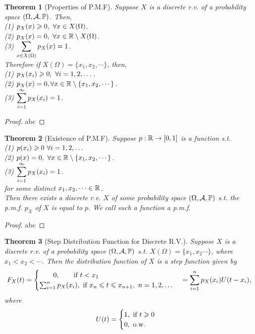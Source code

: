 \documentclass[openany,12pt]{book}
\newtheorem{theorem}{Theorem}[chapter]
\begin{document}
\begin{theorem}[Properties of P.M.F]
Suppose $X$ is a discrete r.v. of a probability space $(\Omega,\mathcal{A},\mathbb{P})$. Then,\\
(1) $p_X (x)\geqslant0,\ \forall x\in X(\Omega)$.\\
(2) $p_X (x)=0,\ \forall x\in\mathbb{R}\setminus X(\Omega)$.\\
(3) $\displaystyle\sum_{x\in X(\Omega)}p_X (x) =1$.\\
Therefore if $X(\Omega)=\{x_1,x_2,\cdots\}$, then,\\
(1) $p_X (x_i )\geqslant0,\ \forall i=1,2,\dots$.\\
(2) $p_X (x)=0,\forall x\in\mathbb{R}\setminus\{x_1,x_2,\cdots\}$.\\
(3) $\displaystyle\sum_{i=1}^\infty p_X (x_i ) =1$.\\
\end{theorem}

\begin{proof}
  abc
\end{proof}

\begin{theorem}[Existence of P.M.F]
Suppose $p: \mathbb{R}\to[0,1]$ is a function s.t.\\
(1) $p(x_i )\geqslant0\ \forall i=1,2,\dots$\\
(2) $p(x)=0,\ \forall x\in\mathbb{R}\setminus\{x_1,x_2,\cdots\}$.\\
(3) $\displaystyle\sum_{i=1}^\infty p_X (x_i ) =1$.\\
for some distinct $x_1,x_2,\cdots\in\mathbb{R}$.\\
Then there exists a discrete r.v. $X$ of some probability space $(\Omega,\mathcal{A},\mathbb{P})$ s.t. the p.m.f. $p_X$ of $X$ is equal to $p$. We call such a function a p.m.f.
\end{theorem}

\begin{proof}
  abc
\end{proof}

\begin{theorem}[Step Distribution Function for Discrete R.V.]
Suppose $X$ is a discrete r.v. of a probability space $(\Omega,\mathcal{A},\mathbb{P})$ s.t. $X(\Omega)=\{x_1,x_2\cdots\}$, where $x_1<x_2<\cdots$. Then the distribution function of $X$ is a step function given by
$$
F_X (t)=
\begin{cases}
\qquad0,\qquad \text{if} \ t<x_1\\
\sum_{i=1}^{n} p_X (x_i ),\ \text{if} \ x_n\leqslant t\leqslant x_{n+1}, \ n=1,2,\dots
\end{cases}
=\sum_{i=1}^{n} p_X (x_i )U(t-x_i),
$$
where
$$
U(t)=\begin{cases}
1,\ \text{if}\ t\geqslant0\\
0,\ \text{o.w.}
\end{cases}
$$
\end{theorem}
\end{document}
